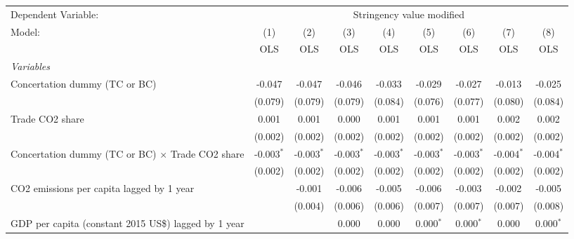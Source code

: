 
\begingroup
\centering
\begin{tabular}{lcccccccc}
   \toprule
   Dependent Variable: & \multicolumn{8}{c}{Stringency value modified}\\
   Model:                                                     & (1)          & (2)          & (3)          & (4)          & (5)          & (6)          & (7)          & (8)\\  
                                                              &  OLS         & OLS          & OLS          & OLS          & OLS          & OLS          & OLS          & OLS\\  
   \midrule
   \emph{Variables}\\
   Concertation dummy (TC or BC)                              & -0.047       & -0.047       & -0.046       & -0.033       & -0.029       & -0.027       & -0.013       & -0.025\\   
                                                              & (0.079)      & (0.079)      & (0.079)      & (0.084)      & (0.076)      & (0.077)      & (0.080)      & (0.084)\\   
   Trade CO2 share                                            & 0.001        & 0.001        & 0.000        & 0.001        & 0.001        & 0.001        & 0.002        & 0.002\\   
                                                              & (0.002)      & (0.002)      & (0.002)      & (0.002)      & (0.002)      & (0.002)      & (0.002)      & (0.002)\\   
   Concertation dummy (TC or BC) $\times$ Trade CO2 share     & -0.003$^{*}$ & -0.003$^{*}$ & -0.003$^{*}$ & -0.003$^{*}$ & -0.003$^{*}$ & -0.003$^{*}$ & -0.004$^{*}$ & -0.004$^{*}$\\   
                                                              & (0.002)      & (0.002)      & (0.002)      & (0.002)      & (0.002)      & (0.002)      & (0.002)      & (0.002)\\   
   CO2 emissions per capita lagged by 1 year                  &              & -0.001       & -0.006       & -0.005       & -0.006       & -0.003       & -0.002       & -0.005\\   
                                                              &              & (0.004)      & (0.006)      & (0.006)      & (0.007)      & (0.007)      & (0.007)      & (0.008)\\   
   GDP per capita (constant 2015 US\$) lagged by 1 year       &              &              & 0.000        & 0.000        & 0.000$^{*}$  & 0.000$^{*}$  & 0.000        & 0.000$^{*}$\\   

\end{tabular}
